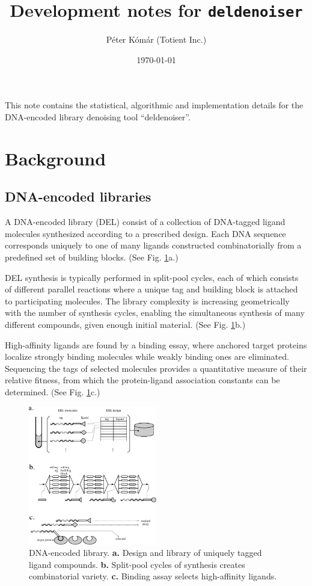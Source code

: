 \documentclass[letter,10pt,oneside]{article}
\author{P\'{e}ter K\'{o}m\'{a}r (Totient Inc.)}
\title{Development notes for \texttt{deldenoiser}}
\date{\today}
\newcommand{\no}{\noindent}
\newcommand{\+}{^\dagger}
\newcommand{\reffig}[1]{Fig. \ref{#1}}
\begin{document}
\thispagestyle{empty}
\maketitle

\no {\bf One sentence summary: } This note contains the statistical, algorithmic and implementation details for the DNA-encoded library denoising tool ``deldenoiser''.

\tableofcontents

\newpage


\section{Background}


\subsection{DNA-encoded libraries}

A DNA-encoded library (DEL) consist of a collection of DNA-tagged ligand molecules synthesized according to a prescribed design. Each DNA sequence corresponds uniquely to one of many ligands constructed combinatorially from a predefined set of building blocks. (See \reffig{fig:DEL_overview}a.)

DEL synthesis is typically performed in split-pool cycles, each of which consists of different parallel reactions where a unique tag and building block is attached to participating molecules. The library complexity is increasing geometrically with the number of synthesis cycles, enabling the simultaneous synthesis of many different compounds, given enough initial material. (See \reffig{fig:DEL_overview}b.)

High-affinity ligands are found by a binding essay, where anchored target proteins localize strongly binding molecules while weakly binding ones are eliminated. Sequencing the tags of selected molecules provides a quantitative measure of their relative fitness, from which the protein-ligand association constants can be determined. (See \reffig{fig:DEL_overview}c.)

\begin{figure}[h]
  \centering
  \includegraphics[width=0.5\textwidth]{figs/DEL_overview.pdf}
  \caption{
    \label{fig:DEL_overview}
    DNA-encoded library. {\bf a.} Design and library of uniquely tagged ligand compounds. {\bf b.} Split-pool cycles of synthesis creates combinatorial variety. {\bf c.} Binding assay selects high-affinity ligands.
  }
\end{figure}
\end{document}
